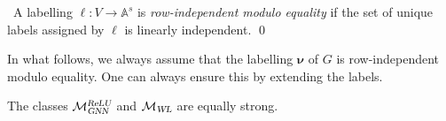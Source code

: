 \begin{definition}\label{def:label2}\
	A labelling $\pmb{\ell}:V\to\mathbb{A}^s$ is \textit{row-independent modulo
  equality} if the set of unique labels assigned by $\pmb{\ell}$ is linearly independent. \qed
\end{definition}
In what follows, we always assume that the labelling $\pmb{\nu}$ of $G$ is row-independent modulo equality. One can always ensure this by extending the labels. 
%
\begin{proposition}\label{prop:equalstrong}
The classes $\mathcal{M}_{\textsl{GNN}}^{\textsl{ReLU}}$ and  $\mathcal{M}_{\textsl{WL}}$ are equally strong.
\end{proposition}
